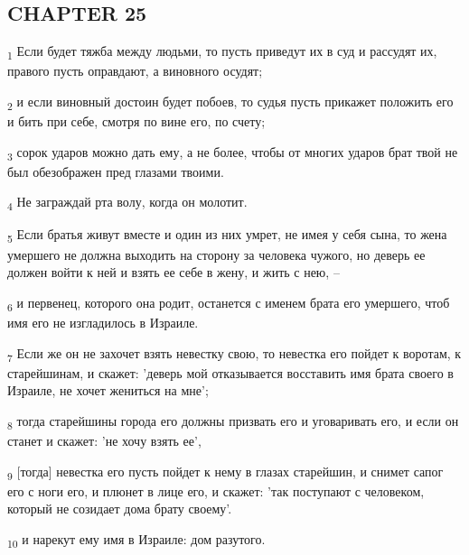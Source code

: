 \subsection{CHAPTER 25}
\begin{tcolorbox}
\textsubscript{1} Если будет тяжба между людьми, то пусть приведут их в суд и рассудят их, правого пусть оправдают, а виновного осудят;
\end{tcolorbox}
\begin{tcolorbox}
\textsubscript{2} и если виновный достоин будет побоев, то судья пусть прикажет положить его и бить при себе, смотря по вине его, по счету;
\end{tcolorbox}
\begin{tcolorbox}
\textsubscript{3} сорок ударов можно дать ему, а не более, чтобы от многих ударов брат твой не был обезображен пред глазами твоими.
\end{tcolorbox}
\begin{tcolorbox}
\textsubscript{4} Не заграждай рта волу, когда он молотит.
\end{tcolorbox}
\begin{tcolorbox}
\textsubscript{5} Если братья живут вместе и один из них умрет, не имея у себя сына, то жена умершего не должна выходить на сторону за человека чужого, но деверь ее должен войти к ней и взять ее себе в жену, и жить с нею, --
\end{tcolorbox}
\begin{tcolorbox}
\textsubscript{6} и первенец, которого она родит, останется с именем брата его умершего, чтоб имя его не изгладилось в Израиле.
\end{tcolorbox}
\begin{tcolorbox}
\textsubscript{7} Если же он не захочет взять невестку свою, то невестка его пойдет к воротам, к старейшинам, и скажет: 'деверь мой отказывается восставить имя брата своего в Израиле, не хочет жениться на мне';
\end{tcolorbox}
\begin{tcolorbox}
\textsubscript{8} тогда старейшины города его должны призвать его и уговаривать его, и если он станет и скажет: 'не хочу взять ее',
\end{tcolorbox}
\begin{tcolorbox}
\textsubscript{9} [тогда] невестка его пусть пойдет к нему в глазах старейшин, и снимет сапог его с ноги его, и плюнет в лице его, и скажет: 'так поступают с человеком, который не созидает дома брату своему'.
\end{tcolorbox}
\begin{tcolorbox}
\textsubscript{10} и нарекут ему имя в Израиле: дом разутого.
\end{tcolorbox}
